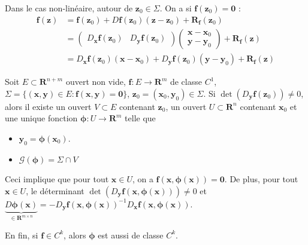 Dans le cas non-linéaire, autour de $\boldsymbol{z}_{0}\in\Sigma$. On a si $\boldsymbol{f}(\boldsymbol{z}_{0})=\boldsymbol{0}$ :
\begin{align*}
\boldsymbol{f}(\boldsymbol{z}) & =\boldsymbol{f}(\boldsymbol{z}_{0})+D\boldsymbol{f}(\boldsymbol{z}_{0})(\boldsymbol{z}-\boldsymbol{z}_{0})+\boldsymbol{R}_{\boldsymbol{f}}(\boldsymbol{z}_{0}) \\
 & =\begin{pmatrix}
D_{\boldsymbol{x}}\boldsymbol{f} (\boldsymbol{z}_{0}) & D_{\boldsymbol{y}}\boldsymbol{f}(\boldsymbol{z}_{0})
\end{pmatrix}\begin{pmatrix}
\boldsymbol{x}-\boldsymbol{x}_{0} \\
\boldsymbol{y}-\boldsymbol{y}_{0}
\end{pmatrix}+\boldsymbol{R}_{\boldsymbol{f}}(\boldsymbol{z}) \\
 & =D_{\boldsymbol{x}}\boldsymbol{f}(\boldsymbol{z}_{0})(\boldsymbol{x}-\boldsymbol{x}_{0})+D_{\boldsymbol{y}}\boldsymbol{f}(\boldsymbol{z}_{0})(\boldsymbol{y}-\boldsymbol{y}_{0}) +\boldsymbol{R}_{\boldsymbol{f}}(\boldsymbol{z})
\end{align*}
\begin{theorem}
Soit $E\subset \mathbf{R}^{n+m}$ ouvert non vide, $\boldsymbol{f}:E\to \mathbf{R}^{m}$ de classe $C^{1}$, $\Sigma=\{(\boldsymbol{x},\boldsymbol{y})\in E:\boldsymbol{f}(\boldsymbol{x},\boldsymbol{y})=\boldsymbol{0} \}$, $\boldsymbol{z}_{0}=(\boldsymbol{x}_{0},\boldsymbol{y}_{0})\in\Sigma$. Si $\det(D_{\boldsymbol{y}}\boldsymbol{f}(\boldsymbol{z}_{0}))\neq 0$, alors il existe un ouvert $V\subset E$ contenant $\boldsymbol{z}_{0}$, un ouvert $U\subset \mathbf{R}^{n}$ contenant $\boldsymbol{x}_{0}$ et une unique fonction $\boldsymbol{\phi}:U\to \mathbf{R}^{m}$ telle que
\begin{itemize}
\item $\boldsymbol{y}_{0}=\boldsymbol{\phi}(\boldsymbol{x}_{0})$.
\item $\mathcal{G}(\boldsymbol{\phi})=\Sigma \cap V$
\end{itemize}

Ceci implique que pour tout $\boldsymbol{x}\in U$, on a $\boldsymbol{f}(\boldsymbol{x},\boldsymbol{\phi}(\boldsymbol{x}))=\boldsymbol{0}$. De plus, pour tout $\boldsymbol{x}\in U$, le déterminant $\det(D_{\boldsymbol{y}}\boldsymbol{f}(\boldsymbol{x},\boldsymbol{\phi}(\boldsymbol{x})))\neq 0$ et $\underbrace{ D\boldsymbol{\phi}(\boldsymbol{x}) }_{ \in \mathbf{R}^{m\times n} }=-D_{\boldsymbol{y}}\boldsymbol{f}(\boldsymbol{x},\boldsymbol{\phi}(\boldsymbol{x}))^{-1}D_{\boldsymbol{x}}\boldsymbol{f}(\boldsymbol{x},\boldsymbol{\phi}(\boldsymbol{x}))$. 

En fin, si $\boldsymbol{f}\in C^{k}$, alors $\boldsymbol{\phi}$ est aussi de classe $C^{k}$.
\end{theorem}   
